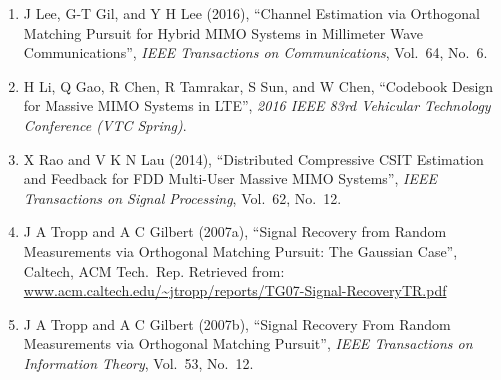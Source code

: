 \documentclass[12pt]{article}
\begin{document}
\begin{enumerate}
\item J Lee, G-T Gil, and Y H Lee (2016), ``Channel Estimation via Orthogonal Matching Pursuit for Hybrid MIMO Systems in Millimeter Wave Communications'', \textit{IEEE Transactions on Communications}, Vol.\ 64, No.\ 6.

\item H Li, Q Gao, R Chen, R Tamrakar, S Sun, and W Chen, ``Codebook Design for Massive MIMO Systems in LTE'', \textit{2016 IEEE 83rd Vehicular Technology Conference (VTC Spring)}.

\item X Rao and V K N Lau (2014), ``Distributed Compressive CSIT Estimation and Feedback for FDD Multi-User Massive MIMO Systems'', \textit{IEEE Transactions on Signal Processing}, Vol.\ 62, No.\ 12.

\item J A Tropp and A C Gilbert (2007a), ``Signal Recovery from Random Measurements via Orthogonal Matching Pursuit: The Gaussian Case'', Caltech, ACM Tech.\ Rep. Retrieved from: \url{www.acm.caltech.edu/~jtropp/reports/TG07-Signal-RecoveryTR.pdf}

\item J A Tropp and A C Gilbert (2007b), ``Signal Recovery From Random Measurements via Orthogonal Matching Pursuit'', \textit{IEEE Transactions on Information Theory}, Vol.\ 53, No.\ 12.


\end{enumerate}
\end{document}
